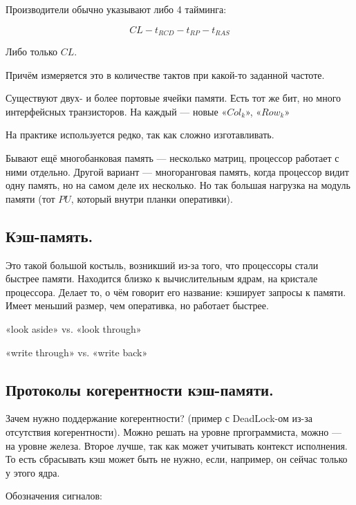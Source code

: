 \documentclass[12pt, a4paper]{article}
\begin{document}
Производители обычно указывают либо 4 тайминга:

\begin{equation*}
    CL - t_{RCD} - t_{RP} - t_{RAS}
\end{equation*}

Либо только $CL$.

Причём измеряется это в количестве тактов при какой-то заданной частоте.



Существуют двух- и более портовые ячейки памяти. Есть тот же бит, но много интерфейсных транзисторов.
На каждый — новые «$Col_k$», «$Row_k$»

На практике используется редко, так как сложно изготавливать. 

Бывают ещё многобанковая память — несколько матриц, процессор работает с ними отдельно.
Другой вариант — многоранговая память, когда процессор видит одну память, но на самом деле их несколько.
Но так большая нагрузка на модуль памяти (тот $PU$, который внутри планки оперативки).



\subsection{Кэш-память.}

Это такой большой костыль, возникший из-за того, что процессоры стали быстрее памяти.
Находится близко к вычислительным ядрам, на кристале процессора.
Делает то, о чём говорит его название: кэширует запросы к памяти.
Имеет меньший размер, чем оперативка, но работает быстрее.

«look aside» vs. «look through»

«write through» vs. «write back»


\subsection{Протоколы когерентности кэш-памяти.}

Зачем нужно поддержание когерентности? (пример с DeadLock-ом из-за отсутствия когерентности).
Можно решать на уровне пргограммиста, можно — на уровне железа. 
Второе лучше, так как может учитывать контекст исполнения. 
То есть сбрасывать кэш может быть не нужно, если, например, он сейчас только у этого ядра.


Обозначения сигналов:
\end{document}
